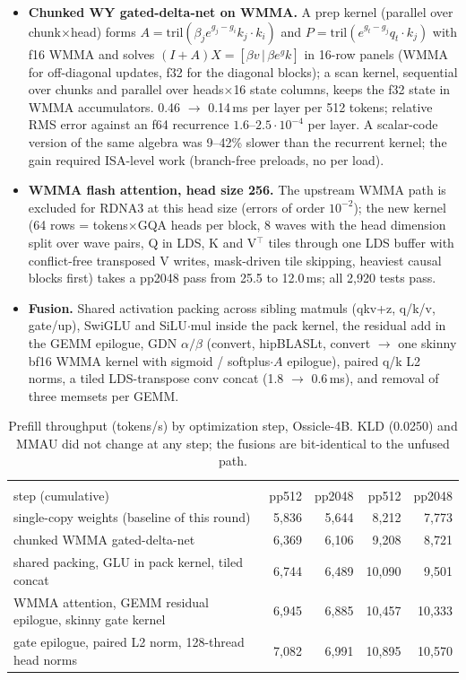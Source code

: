 \documentclass[10.5pt,a4paper]{article}
\newcommand{\tx}[1]{\texttt{\detokenize{#1}}}
\begin{document}
\begin{itemize}
\item \textbf{Chunked WY gated-delta-net on WMMA.} A prep kernel (parallel over chunk$\times$head) forms $A=\mathrm{tril}(\beta_je^{g_j-g_i}k_j\!\cdot\!k_i)$ and $P=\mathrm{tril}(e^{g_t-g_j}q_t\!\cdot\!k_j)$ with f16 WMMA and solves
$(I+A)X=[\beta v\,|\,\beta e^{g}k]$ in 16-row panels (WMMA for off-diagonal updates, f32 for the diagonal blocks); a scan kernel, sequential over chunks and parallel over heads$\times$16 state columns, keeps the f32 state in WMMA
accumulators. 0.46 $\to$ 0.14\,ms per layer per 512 tokens; relative RMS error against an f64 recurrence $1.6$--$2.5\cdot10^{-4}$ per layer. A scalar-code version of the same algebra was 9--42\% slower than the recurrent kernel; the gain
required ISA-level work (branch-free preloads, no \tx{vmcnt(0)} per load).
\item \textbf{WMMA flash attention, head size 256.} The upstream WMMA path is excluded for RDNA3 at this head size (errors of order $10^{-2}$); the new kernel (64 rows = tokens$\times$GQA heads per block, 8 waves with the head dimension
split over wave pairs, Q in LDS, K and V$^{\top}$ tiles through one LDS buffer with conflict-free transposed V writes, mask-driven tile skipping, heaviest causal blocks first) takes a pp2048 pass from 25.5 to 12.0\,ms; all 2{,}920
\tx{FLASH_ATTN_EXT} tests pass.
\item \textbf{Fusion.} Shared activation packing across sibling matmuls (qkv+z, q/k/v, gate/up), SwiGLU and SiLU$\cdot$mul inside the pack kernel, the residual add in the GEMM epilogue, GDN $\alpha/\beta$ (convert, hipBLASLt, convert $\to$ one skinny bf16 WMMA
kernel with sigmoid / softplus$\cdot A$ epilogue), paired q/k L2 norms, a tiled LDS-transpose conv concat (1.8 $\to$ 0.6\,ms), and removal of three memsets per GEMM.
\end{itemize}

\begin{table}[H]
\centering\small
\begin{tabular}{@{}p{8.2cm}rrrr@{}}
\toprule
 & \multicolumn{2}{c}{\tx{quality}} & \multicolumn{2}{c}{\tx{fast}}\\
step (cumulative) & pp512 & pp2048 & pp512 & pp2048\\
\midrule
single-copy weights (baseline of this round) & 5{,}836 & 5{,}644 & 8{,}212 & 7{,}773\\
chunked WMMA gated-delta-net & 6{,}369 & 6{,}106 & 9{,}208 & 8{,}721\\
shared packing, GLU in pack kernel, tiled concat & 6{,}744 & 6{,}489 & 10{,}090 & 9{,}501\\
WMMA attention, GEMM residual epilogue, skinny gate kernel & 6{,}945 & 6{,}885 & 10{,}457 & 10{,}333\\
gate epilogue, paired L2 norm, 128-thread head norms & 7{,}082 & 6{,}991 & 10{,}895 & 10{,}570\\
\bottomrule
\end{tabular}
\caption{Prefill throughput (tokens/s) by optimization step, Ossicle-4B. KLD (0.0250) and MMAU did not change at any step; the fusions are bit-identical to the unfused path.}
\end{table}
\end{document}
